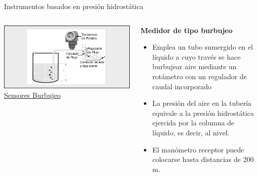 \documentclass[aspectratio=169]{beamer}
\begin{document}
\begin{frame}{Instrumentos basados en presión hidrostática}
    \begin{columns}[c, onlytextwidth]
        \begin{column}{0.45\textwidth}
        \centering
        \includegraphics[width = 1\linewidth]{fig/Nivel/Burbujeo.png}
            \tiny{\href{https://www.researchgate.net/publication/316675361_Fundamentos_de_la_medicion_de_presion_nivel_y_caudal_en_los_sistemas_hidraulicos}{Sensores Burbujeo}}
        \end{column}
        \begin{column}{0.55\textwidth}
        \textbf{Medidor de tipo burbujeo}
            \begin{itemize}
                \item Emplea un tubo sumergido en el líquido a cuyo través se hace burbujear aire mediante un rotámetro con un regulador de caudal incorporado
                \item La presión del aire en la tubería equivale a la presión hidrostática ejercida por la columna de líquido, es decir, al nivel. 
                \item El manómetro receptor puede colocarse hasta distancias de 200 m.
    
            \end{itemize}
            
        \end{column}
    \end{columns}
\end{frame} 
\end{document}
